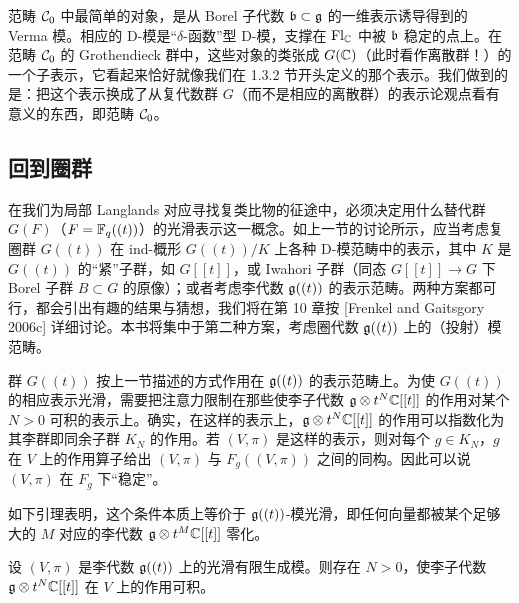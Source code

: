 范畴 $\mathcal{C}_0$ 中最简单的对象，是从 Borel 子代数 $\mathfrak{b}\subset\mathfrak{g}$ 的一维表示诱导得到的 Verma 模。相应的 D-模是“$\delta$-函数”型 D-模，支撑在 $\operatorname{Fl}_{\mathbb{C}}$ 中被 $\mathfrak{b}$ 稳定的点上。在范畴 $\mathcal{C}_0$ 的 Grothendieck 群中，这些对象的类张成 $G(\mathbb{C})$（此时看作离散群！）的一个子表示，它看起来恰好就像我们在 1.3.2 节开头定义的那个表示。我们做到的是：把这个表示换成了从复代数群 $G$（而不是相应的离散群）的表示论观点看有意义的东西，即范畴 $\mathcal{C}_0$。

\subsection{回到圈群}

在我们为局部 Langlands 对应寻找复类比物的征途中，必须决定用什么替代群 $G(F)$（$F=\mathbb{F}_q((t))$）的光滑表示这一概念。如上一节的讨论所示，应当考虑复圈群 $G((t))$ 在 ind-概形 $G((t))/K$ 上各种 D-模范畴中的表示，其中 $K$ 是 $G((t))$ 的“紧”子群，如 $G[[t]]$，或 Iwahori 子群（同态 $G[[t]]\to G$ 下 Borel 子群 $B\subset G$ 的原像）；或者考虑李代数 $\mathfrak{g}((t))$ 的表示范畴。两种方案都可行，都会引出有趣的结果与猜想，我们将在第 10 章按 [Frenkel and Gaitsgory 2006c] 详细讨论。本书将集中于第二种方案，考虑圈代数 $\mathfrak{g}((t))$ 上的（投射）模范畴。

群 $G((t))$ 按上一节描述的方式作用在 $\mathfrak{g}((t))$ 的表示范畴上。为使 $G((t))$ 的相应表示光滑，需要把注意力限制在那些使李子代数 $\mathfrak{g}\otimes t^N\mathbb{C}[[t]]$ 的作用对某个 $N>0$ 可积的表示上。确实，在这样的表示上，$\mathfrak{g}\otimes t^N\mathbb{C}[[t]]$ 的作用可以指数化为其李群即同余子群 $K_N$ 的作用。若 $(V,\pi)$ 是这样的表示，则对每个 $g\in K_N$，$g$ 在 $V$ 上的作用算子给出 $(V,\pi)$ 与 $F_g((V,\pi))$ 之间的同构。因此可以说 $(V,\pi)$ 在 $F_g$ 下“稳定”。

如下引理表明，这个条件本质上等价于 $\mathfrak{g}((t))$-模光滑，即任何向量都被某个足够大的 $M$ 对应的李代数 $\mathfrak{g}\otimes t^M\mathbb{C}[[t]]$ 零化。

\begin{lemma}\label{lem:u02-smooth-fg}
    设 $(V,\pi)$ 是李代数 $\mathfrak{g}((t))$ 上的光滑有限生成模。则存在 $N>0$，使李子代数 $\mathfrak{g}\otimes t^N\mathbb{C}[[t]]$ 在 $V$ 上的作用可积。
\end{lemma}

